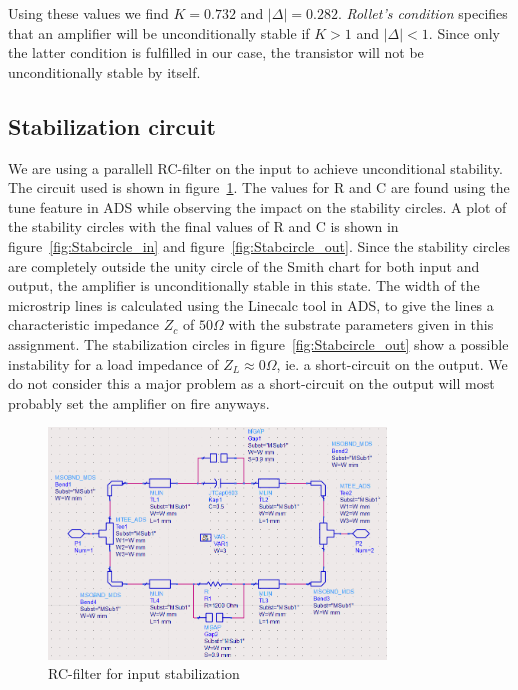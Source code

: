   Using these values we find $K = 0.732$ and $\lvert \Delta \rvert = 0.282$. \emph{Rollet's condition} specifies that an amplifier will be unconditionally stable if $K > 1$ and $\lvert \Delta \rvert < 1$. Since only the latter condition is fulfilled in our case, the transistor will not be unconditionally stable by itself.

  \subsection{Stabilization circuit}
  We are using a parallell RC-filter on the input to achieve unconditional stability. The circuit used is shown in figure~\ref{fig:Stabschem}. The values for R and C are found using the tune feature in ADS while observing the impact on the stability circles. A plot of the stability circles with the final values of R and C is shown in figure~\ref{fig:Stabcircle_in} and figure~\ref{fig:Stabcircle_out}. Since the stability circles are completely outside the unity circle of the Smith chart for both input and output, the amplifier is unconditionally stable in this state. The width of the microstrip lines is calculated using the Linecalc tool in ADS, to give the lines a characteristic impedance $Z_c$ of $50 \Omega$ with the substrate parameters given in this assignment.
  The stabilization circles in figure~\ref{fig:Stabcircle_out} show a possible instability for a load impedance of $Z_L \approx 0 \Omega$, ie. a short-circuit on the output. We do not consider this a major problem as a short-circuit on the output will most probably set the amplifier on fire anyways.

  \begin{figure}[H]
	  \centering
	  \includegraphics[width=0.8\textwidth]{img/Stabilization_circuit}
	  \caption{RC-filter for input stabilization}
	  \label{fig:Stabschem}
  \end{figure}

